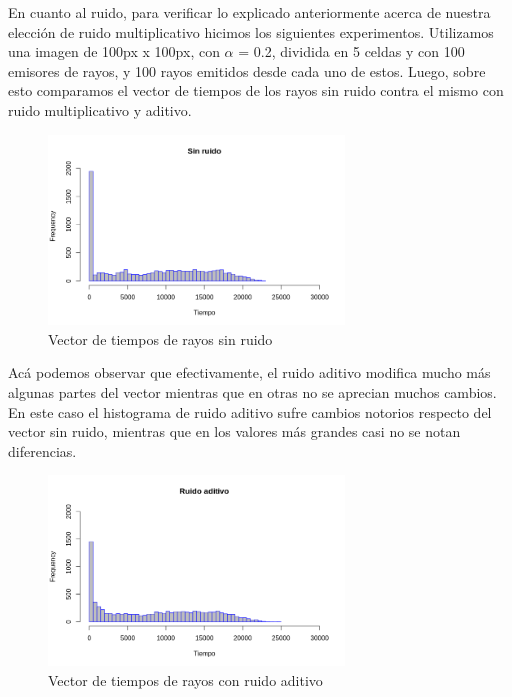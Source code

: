 

\par En cuanto al ruido, para verificar lo explicado anteriormente acerca de nuestra elección de ruido multiplicativo hicimos los siguientes experimentos.
Utilizamos una imagen de 100px x 100px, con $\alpha$ = 0.2, dividida en 5 celdas y con 100 emisores de rayos, y 100 rayos emitidos desde cada uno de estos. Luego, sobre esto comparamos el vector de tiempos de los rayos sin ruido contra el mismo con ruido multiplicativo y aditivo. 

\begin{figure}[H]
	\centering	\includegraphics[width=0.7\textwidth]{img/sinRuido.png}
	\caption{Vector de tiempos de rayos sin ruido}
	\label{fig:etiqueta}
\end{figure}
\par Acá podemos observar que efectivamente, el ruido aditivo modifica mucho más algunas partes del vector mientras que en otras no se aprecian muchos cambios. En este caso el histograma de ruido aditivo sufre cambios notorios respecto del vector sin ruido, mientras que en los valores más grandes casi no se notan diferencias.

\begin{figure}[H]
	\centering	\includegraphics[width=0.7\textwidth]{img/ruidoAditivo.png}
	\caption{Vector de tiempos de rayos con ruido aditivo}
	\label{fig:etiqueta}
\end{figure}

